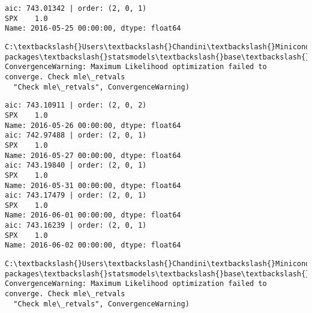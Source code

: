 \documentclass[11pt]{article}
\begin{document}
    \begin{Verbatim}[commandchars=\\\{\}]
aic: 743.01342 | order: (2, 0, 1)
SPX    1.0
Name: 2016-05-25 00:00:00, dtype: float64

    \end{Verbatim}

    \begin{Verbatim}[commandchars=\\\{\}]
C:\textbackslash{}Users\textbackslash{}Chandini\textbackslash{}Miniconda3\textbackslash{}envs\textbackslash{}auquan\textbackslash{}lib\textbackslash{}site-packages\textbackslash{}statsmodels\textbackslash{}base\textbackslash{}model.py:496: ConvergenceWarning: Maximum Likelihood optimization failed to converge. Check mle\_retvals
  "Check mle\_retvals", ConvergenceWarning)

    \end{Verbatim}

    \begin{Verbatim}[commandchars=\\\{\}]
aic: 743.10911 | order: (2, 0, 2)
SPX    1.0
Name: 2016-05-26 00:00:00, dtype: float64
aic: 742.97488 | order: (2, 0, 1)
SPX    1.0
Name: 2016-05-27 00:00:00, dtype: float64
aic: 743.19840 | order: (2, 0, 1)
SPX    1.0
Name: 2016-05-31 00:00:00, dtype: float64
aic: 743.17479 | order: (2, 0, 1)
SPX    1.0
Name: 2016-06-01 00:00:00, dtype: float64
aic: 743.16239 | order: (2, 0, 1)
SPX    1.0
Name: 2016-06-02 00:00:00, dtype: float64

    \end{Verbatim}

    \begin{Verbatim}[commandchars=\\\{\}]
C:\textbackslash{}Users\textbackslash{}Chandini\textbackslash{}Miniconda3\textbackslash{}envs\textbackslash{}auquan\textbackslash{}lib\textbackslash{}site-packages\textbackslash{}statsmodels\textbackslash{}base\textbackslash{}model.py:496: ConvergenceWarning: Maximum Likelihood optimization failed to converge. Check mle\_retvals
  "Check mle\_retvals", ConvergenceWarning)

    \end{Verbatim}
\end{document}
